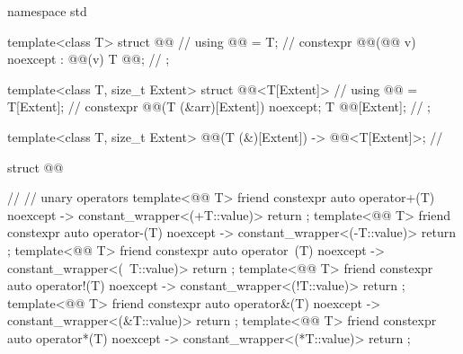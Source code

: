 \begin{codeblock}
namespace std {
  template<class T>
  struct @@ {                                                         // \expos
    using @@ = T;                                                               // \expos
    constexpr @@(@@ v) noexcept : @@(v) {}
    T @@;                                                                       // \expos
  };

  template<class T, size_t Extent>
  struct @@<T[Extent]> {                                              // \expos
    using @@ = T[Extent];                                                       // \expos
    constexpr @@(T (&arr)[Extent]) noexcept;
    T @@[Extent];                                                               // \expos
  };

  template<class T, size_t Extent>
    @@(T (&)[Extent]) -> @@<T[Extent]>;                   // \expos

  struct @@ {                                                           // \expos
    // unary operators
    template<@@ T>
      friend constexpr auto operator+(T) noexcept -> constant_wrapper<(+T::value)>
        { return {}; }
    template<@@ T>
      friend constexpr auto operator-(T) noexcept -> constant_wrapper<(-T::value)>
        { return {}; }
    template<@@ T>
      friend constexpr auto operator~(T) noexcept -> constant_wrapper<(~T::value)>
        { return {}; }
    template<@@ T>
      friend constexpr auto operator!(T) noexcept -> constant_wrapper<(!T::value)>
        { return {}; }
    template<@@ T>
      friend constexpr auto operator&(T) noexcept -> constant_wrapper<(&T::value)>
        { return {}; }
    template<@@ T>
      friend constexpr auto operator*(T) noexcept -> constant_wrapper<(*T::value)>
        { return {}; }

}}
\end{codeblock}
